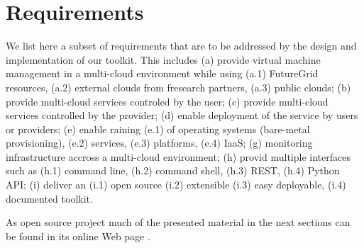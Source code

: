 \documentclass{tex/sig-alternate-2013}
\newcommand{\todo}[1]{{\color{red}{#1}}}
\begin{document}

\section{Requirements} \label{S:requirements}

\todo{READ}

We list here a subset of requirements that are to be addressed by the
design and implementation of our toolkit. This includes (a) provide
virtual machine management in a multi-cloud environment while using
(a.1) FutureGrid resources, (a.2) external clouds from fresearch
partners, (a.3) public clouds; (b) provide multi-cloud services
controled by the user; (c) provide multi-cloud services controlled by
the provider; (d) enable deployment of the service by users or
providers; (e) enable raining (e.1) of operating systems (bare-metal
provisioning), (e.2) services, (e.3) platforms, (e.4) IaaS; (g)
monitoring infrastructure accross a multi-cloud environment; (h)
provid multiple interfaces such as (h.1) command line, (h.2) command shell, (h.3) REST,
(h.4) Python API; (i) deliver an (i.1) open source (i.2) extensible (i.3) easy
deployable, (i.4) documented toolkit.

As open source project much of the presented material in the next
sections can be found in its online Web page
\cite{github-cloudmesh}. 
\end{document}

